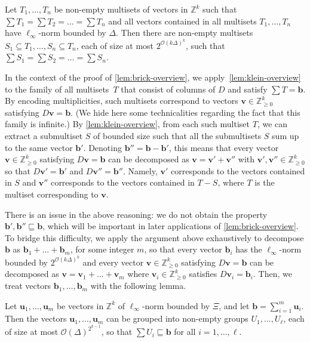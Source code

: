 \documentclass{article}
\renewcommand{\geq}{\geqslant}
\newcommand{\cfleq}{\sqsubseteq}
\newcommand{\Z}{\mathbb{Z}}
\newcommand{\Zn}{\Z_{\geq 0}}
\newcommand{\tup}[1]{{\mathbf{#1}}}
\newcommand{\bb}{\tup b}
\newcommand{\uu}{\tup u}
\newcommand{\myvv}{\tup v} %
\newcommand{\Oh}{{\mathcal{O}}}
\renewcommand{\setminus}{-}
\begin{document}
\begin{lemma}\label{lem:klein-overview}
Let $T_1,\ldots,T_n$ be non-empty multisets of vectors in $\Z^k$ such that $\sum T_1=\sum T_2=\ldots=\sum T_n$ and all vectors contained in all multisets $T_1,\ldots,T_n$ have $\ell_\infty$-norm bounded by $\Delta$. Then there are non-empty multisets $S_1\subseteq T_1,\ldots,S_n\subseteq T_n$, each of size at most $2^{\Oh(k\Delta)^k}$, such that $\sum S_1=\sum S_2=\ldots=\sum S_n$.
\end{lemma}

In the context of the proof of \cref{lem:brick-overview}, we apply~\cref{lem:klein-overview} to the family of all multisets~$T$ that consist of columns of $D$ and satisfy $\sum T=\bb$. By encoding multiplicities, such multisets correspond to vectors $\myvv\in \Zn^k$ satisfying $D\myvv=\bb$. (We hide here some technicalities regarding the fact that this family is infinite.) By \cref{lem:klein-overview}, from each such multiset $T$, we can extract a submultiset $S$ of bounded size such that all the submultisets $S$ sum up to the same vector $\bb'$. Denoting $\bb''=\bb-\bb'$, this means that every vector $\myvv\in \Zn^k$ satisfying $D\myvv=\bb$ can be decomposed as $\myvv=\myvv'+\myvv''$ with $\myvv',\myvv''\in \Zn^k$ so that $D\myvv'=\bb'$ and $D\myvv''=\bb''$. Namely, $\myvv'$ corresponds to the vectors contained in $S$ and $\myvv''$ corresponds to the vectors contained in $T\setminus S$, where $T$ is the multiset corresponding to $\myvv$.

There is an issue in the above reasoning: we do not obtain the property $\bb',\bb''\cfleq \bb$, which will be important in later applications of \cref{lem:brick-overview}. To bridge this difficulty, we apply the argument above exhaustively to decompose $\bb$ as $\bb_1+\ldots+\bb_m$, for some integer $m$, so that every vector $\bb_i$ has the $\ell_\infty$-norm bounded by $2^{\Oh(k\Delta)^k}$ and every vector $\myvv\in \Zn^k$ satisfying $D\myvv=\bb$ can be decomposed as $\myvv=\myvv_1+\ldots+\myvv_m$ where $\myvv_i\in \Zn^k$ satisfies $D\myvv_i=\bb_i$. Then, we treat vectors $\bb_1,\ldots,\bb_m$ with the following lemma.

\begin{lemma}
    \label{lem:bundling-overview}
    Let $\uu_1,\ldots,\uu_m$ be vectors in $\Z^k$ of $\ell_\infty$-norm bounded by $\Xi$, and let $\bb=\sum_{i=1}^m \uu_i$. Then the vectors $\uu_1,\ldots,\uu_m$ can be grouped into non-empty groups $U_1,\ldots,U_\ell$, each of size at most $ \Oh(\Delta)^{2^{k-1}}$, so that $\sum U_i\cfleq \bb$ for all $i=1,\ldots,\ell$.
\end{lemma}
\end{document}
